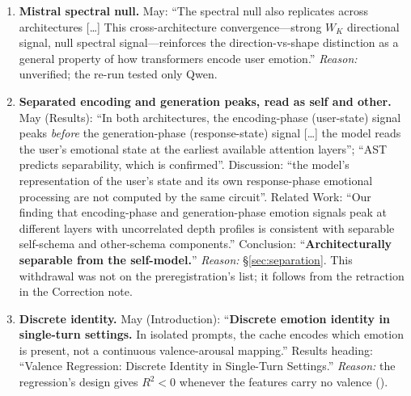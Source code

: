 \documentclass[11pt,a4paper]{article}
\begin{document}
\begin{enumerate}[leftmargin=*]
    \item \textbf{Mistral spectral null.} May: ``The spectral null also replicates across architectures [\ldots] This cross-architecture convergence---strong $W_K$ directional signal, null spectral signal---reinforces the direction-vs-shape distinction as a general property of how transformers encode user emotion.'' \emph{Reason:} unverified; the re-run tested only Qwen.
    \item \label{app:item:separation}\textbf{Separated encoding and generation peaks, read as self and other.} May (Results): ``In both architectures, the encoding-phase (user-state) signal peaks \emph{before} the generation-phase (response-state) signal [\ldots] the model reads the user's emotional state at the earliest available attention layers''; ``AST predicts separability, which is confirmed''. Discussion: ``the model's representation of the user's state and its own response-phase emotional processing are not computed by the same circuit''. Related Work: ``Our finding that encoding-phase and generation-phase emotion signals peak at different layers with uncorrelated depth profiles is consistent with separable self-schema and other-schema components.'' Conclusion: ``\textbf{Architecturally separable from the self-model.}'' \emph{Reason:} \S\ref{sec:separation}. This withdrawal was not on the preregistration's list; it follows from the retraction in the Correction note.
    \item \label{app:item:discrete}\textbf{Discrete identity.} May (Introduction): ``\textbf{Discrete emotion identity in single-turn settings.} In isolated prompts, the cache encodes which emotion is present, not a continuous valence-arousal mapping.'' Results heading: ``Valence Regression: Discrete Identity in Single-Turn Settings.'' \emph{Reason:} the regression's design gives $R^2 < 0$ whenever the features carry no valence ().


\end{enumerate}
\end{document}
